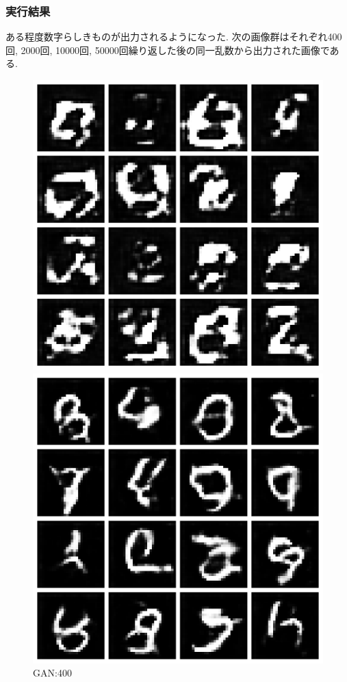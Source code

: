 \documentclass[a4paper,11pt]{jsarticle}
\begin{document}
\subsubsection*{実行結果}

ある程度数字らしきものが出力されるようになった. 次の画像群はそれぞれ400回, 2000回, 10000回, 50000回繰り返した後の同一乱数から出力された画像である.
\begin{figure}[H]
  \begin{minipage}[b]{0.245\linewidth}
    \centering
    \includegraphics[keepaspectratio, width=0.9\linewidth]{../AdvanceB/Image/result_400.png}
    \caption{GAN:400}
  \end{minipage}
  \begin{minipage}[b]{0.245\linewidth}
    \centering
    \includegraphics[keepaspectratio, width=0.9\linewidth]{../AdvanceB/Image/result_2000.png}

\end{minipage}
\end{figure}
\end{document}
